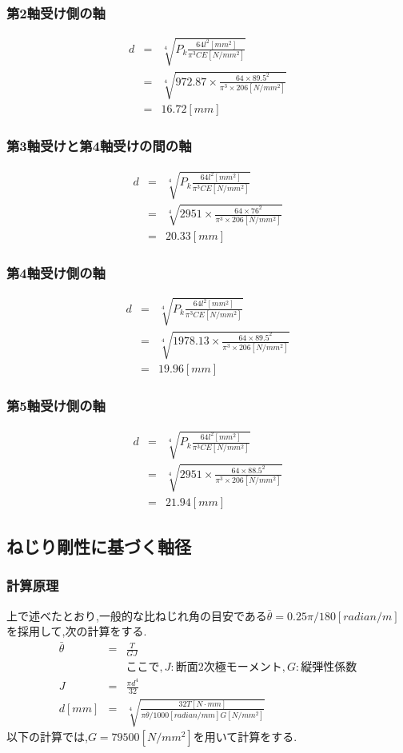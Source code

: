 \subsubsection{第2軸受け側の軸}
\begin{eqnarray}
d&=&\sqrt[4]{P_k\frac{64l^2[mm^2]}{\pi^3CE[N/mm^2]}}\\
 &=&\sqrt[4]{972.87 \times \frac{64\times 89.5^2}{\pi^3 \times 206[N/mm^2]}}\\
 &=&16.72[mm]
\end{eqnarray}
\subsubsection{第3軸受けと第4軸受けの間の軸}
\begin{eqnarray}
d&=&\sqrt[4]{P_k\frac{64l^2[mm^2]}{\pi^3CE[N/mm^2]}}\\
 &=&\sqrt[4]{2951 \times \frac{64\times 76^2}{\pi^3 \times 206[N/mm^2]}}\\
 &=&20.33[mm]
\end{eqnarray}
\subsubsection{第4軸受け側の軸}
\begin{eqnarray}
d&=&\sqrt[4]{P_k\frac{64l^2[mm^2]}{\pi^3CE[N/mm^2]}}\\
 &=&\sqrt[4]{1978.13 \times \frac{64\times 89.5^2}{\pi^3 \times 206[N/mm^2]}}\\
 &=&19.96[mm]
\end{eqnarray}
\subsubsection{第5軸受け側の軸}
\begin{eqnarray}
d&=&\sqrt[4]{P_k\frac{64l^2[mm^2]}{\pi^3CE[N/mm^2]}}\\
 &=&\sqrt[4]{2951 \times \frac{64\times 88.5^2}{\pi^3 \times 206[N/mm^2]}}\\
 &=&21.94[mm]
\end{eqnarray}

\subsection{ねじり剛性に基づく軸径}
\subsubsection{計算原理}
上で述べたとおり,一般的な比ねじれ角の目安である$\bar{\theta} = 0.25\pi /180 [radian/m]$を採用して,次の計算をする.
\begin{eqnarray}
\bar{\theta} &=& \frac{T}{GJ}\\
&&ここで,J:断面2次極モーメント,G:縦弾性係数\\
J&=&\frac{\pi d^4}{32}\\
d[mm]&=&\sqrt[4]{\frac{32T[N \cdot mm]}{\pi \bar{\theta}/1000[radian/mm] G[N/mm^2]}}
\end{eqnarray}
以下の計算では,$G=79500[N/mm^2]$を用いて計算をする.
